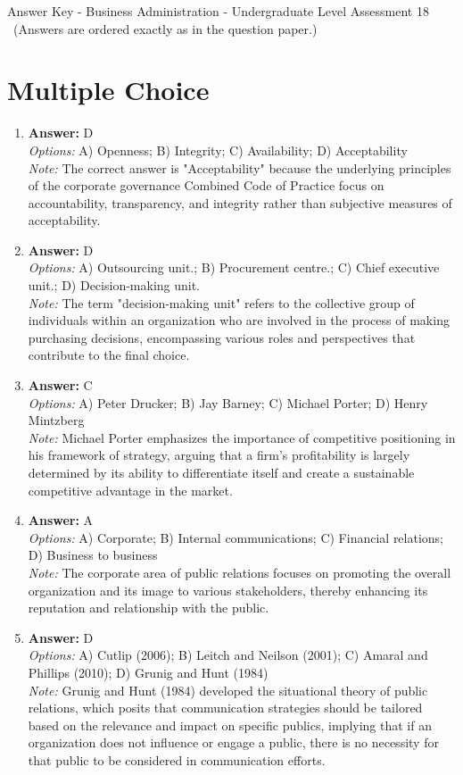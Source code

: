 \documentclass[12pt]{article}
\begin{document}
\begin{center}
Answer Key - Business Administration - Undergraduate Level Assessment 18 \
\small (Answers are ordered exactly as in the question paper.)
\end{center}

\section*{Multiple Choice}
\begin{enumerate}[label=\arabic*.]
\item \textbf{Answer:} D
\\ \textit{Options:} A) Openness; B) Integrity; C) Availability; D) Acceptability
\\ \textit{Note:} The correct answer is "Acceptability" because the underlying principles of the corporate governance Combined Code of Practice focus on accountability, transparency, and integrity rather than subjective measures of acceptability.
\item \textbf{Answer:} D
\\ \textit{Options:} A) Outsourcing unit.; B) Procurement centre.; C) Chief executive unit.; D) Decision-making unit.
\\ \textit{Note:} The term "decision-making unit" refers to the collective group of individuals within an organization who are involved in the process of making purchasing decisions, encompassing various roles and perspectives that contribute to the final choice.
\item \textbf{Answer:} C
\\ \textit{Options:} A) Peter Drucker; B) Jay Barney; C) Michael Porter; D) Henry Mintzberg
\\ \textit{Note:} Michael Porter emphasizes the importance of competitive positioning in his framework of strategy, arguing that a firm's profitability is largely determined by its ability to differentiate itself and create a sustainable competitive advantage in the market.
\item \textbf{Answer:} A
\\ \textit{Options:} A) Corporate; B) Internal communications; C) Financial relations; D) Business to business
\\ \textit{Note:} The corporate area of public relations focuses on promoting the overall organization and its image to various stakeholders, thereby enhancing its reputation and relationship with the public.
\item \textbf{Answer:} D
\\ \textit{Options:} A) Cutlip (2006); B) Leitch and Neilson (2001); C) Amaral and Phillips (2010); D) Grunig and Hunt (1984)
\\ \textit{Note:} Grunig and Hunt (1984) developed the situational theory of public relations, which posits that communication strategies should be tailored based on the relevance and impact on specific publics, implying that if an organization does not influence or engage a public, there is no necessity for that public to be considered in communication efforts.
\end{enumerate}
\end{document}
